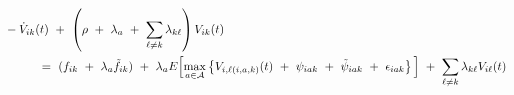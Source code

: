\begin{equation}
\begin{split}
    & -\dot{V}_{ik} (t) \ + \ \left( \rho \ + \ \lambda_{a} \ + \ \sum_{\ell \neq k} \lambda_{k\ell} \right) V_{ik}(t) \\
    & \hspace{1.0cm} = \ (f_{ik} \ + \ \lambda_{a} \tilde{f}_{ik}) \ + \ \lambda_{a} E\Big[ \underset{a \in \mathcal{A}}{\max} \left\{ V_{i,\ell(i, a, k)} (t) \ + \ \psi_{iak} \ + \ \tilde{\psi}_{iak} \ + \ \epsilon_{iak} \right\} \Big] \ + \ \sum_{\ell \neq k} \lambda_{k\ell} V_{i\ell}(t)
\end{split}
\label{Equation:Firms-Problem_Value-Function}
\end{equation}